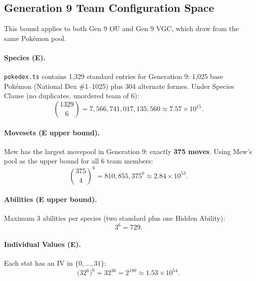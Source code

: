 \subsection{Generation 9 Team Configuration Space}
\label{sec:gen9-derivation}

This bound applies to both Gen 9 OU and Gen 9 VGC, which draw from the same Pokémon pool.

\paragraph{Species \textbf{(E)}.}
\texttt{pokedex.ts} contains 1{,}329 standard entries for Generation 9: 1{,}025 base Pokémon (National Dex \#1--1025) plus 304 alternate formes.
Under Species Clause (no duplicates, unordered team of 6):
\begin{equation}
    \binom{1329}{6} = 7{,}566{,}741{,}017{,}135{,}560 \approx 7.57 \times 10^{15}.
\end{equation}

\paragraph{Movesets \textbf{(E upper bound)}.}
Mew has the largest movepool in Generation 9: exactly \textbf{375 moves}.
Using Mew's pool as the upper bound for all 6 team members:
\begin{equation}
    \binom{375}{4}^6 = 810{,}855{,}375^6 \approx 2.84 \times 10^{53}.
\end{equation}

\paragraph{Abilities \textbf{(E upper bound)}.}
Maximum 3 abilities per species (two standard plus one Hidden Ability):
\begin{equation}
    3^6 = 729.
\end{equation}

\paragraph{Individual Values \textbf{(E)}.}
Each stat has an IV in $\{0,\ldots,31\}$:
\begin{equation}
    \bigl(32^6\bigr)^6 = 32^{36} = 2^{180} \approx 1.53 \times 10^{54}.
\end{equation}

